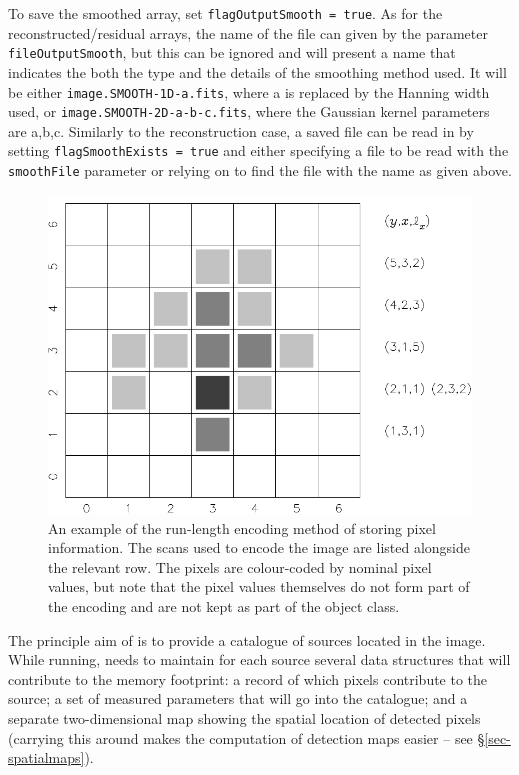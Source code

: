 To save the smoothed array, set \texttt{flagOutputSmooth = true}. As
for the reconstructed/residual arrays, the name of the file can given
by the parameter \texttt{fileOutputSmooth}, but this can be ignored
and \duchamp will present a name that indicates the both the type and
the details of the smoothing method used. It will be either
\texttt{image.SMOOTH-1D-a.fits}, where a is replaced by the Hanning
width used, or \texttt{image.SMOOTH-2D-a-b-c.fits}, where the Gaussian
kernel parameters are a,b,c. Similarly to the reconstruction case, a
saved file can be read in by setting \texttt{flagSmoothExists = true}
and either specifying a file to be read with the \texttt{smoothFile}
parameter or relying on \duchamp to find the file with the name as
given above.


\label{sec-detection}

\label{sec-scan}

\begin{figure}
\includegraphics[width=\textwidth]{exampleObject}
\caption{An example of the run-length encoding method of storing
pixel information. The scans used to encode the image are listed
alongside the relevant row. The pixels are colour-coded by
nominal pixel values, but note that the pixel values themselves
do not form part of the encoding and are not kept as part of the
object class. }
\label{fig-objExample}
\end{figure}

The principle aim of \duchamp is to provide a catalogue of sources
located in the image. While running, \duchamp needs to maintain for
each source several data structures that will contribute to the memory
footprint: a record of which pixels contribute to the source; a set of
measured parameters that will go into the catalogue; and a separate
two-dimensional map showing the spatial location of detected pixels
(carrying this around makes the computation of detection maps easier
-- see \S\ref{sec-spatialmaps}).

